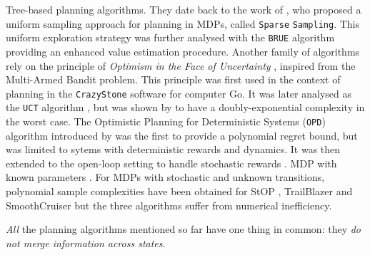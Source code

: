 \documentclass[runningheads]{llncs}
\begin{document}
Tree-based planning algorithms. They date back to the work of \citet{Kearns02SS}, who proposed a uniform sampling approach for planning in MDPs, called \texttt{Sparse} \texttt{Sampling}. This uniform exploration strategy was further analysed with the \texttt{BRUE} algorithm
\citep{Feldman14BRUE} providing an enhanced value estimation procedure. Another family of algorithms rely on the principle of \emph{Optimism in the Face of Uncertainty} \citep[surveyed by][]{SurveyRemiMCTS}, inspired from the Multi-Armed Bandit problem. This principle was first used in the context of planning in the \texttt{CrazyStone} software \citep{Coulom2006} for computer Go. It was later analysed as the \texttt{UCT} algorithm \citep{Kocsis06UCT}, but was shown by \citet{Coquelin2007} to have a doubly-exponential complexity in the worst case. The {Optimistic Planning for Deterministic Systems} (\texttt{OPD}) algorithm introduced by \citet{hren2008optimistic} was the first to provide a polynomial regret bound, but was limited to sytems with deterministic rewards and dynamics. It was then extended to the {open-loop} setting to handle stochastic rewards \citep{bubeck2010open,leurent2019practical}.
MDP with known parameters \citep{busoniu2012optimistic}.
For MDPs with stochastic and unknown transitions, polynomial sample complexities have been obtained for StOP \citep{STOP14}, TrailBlazer \citep{TrailBlazer16} and SmoothCruiser \citep{SmoothCruiser19} but the three algorithms suffer from numerical inefficiency.



\emph{All} the planning algorithms mentioned so far have one thing in common: they \emph{do not merge information across states}.
\end{document}
